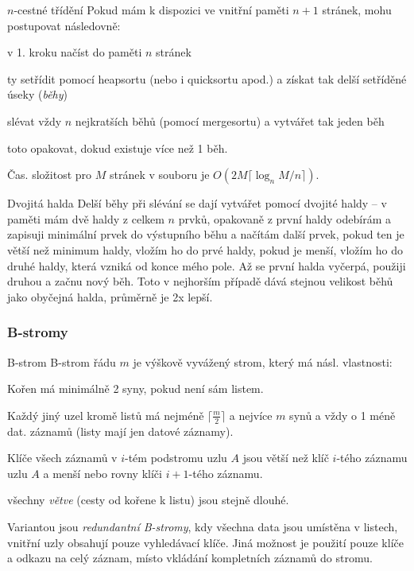 \begin{algoritmusN}{$n$-cestné třídění}
Pokud mám k dispozici ve vnitřní paměti $n+1$ stránek, mohu postupovat následovně:
\begin{pitemize}
    \item v 1. kroku načíst do paměti $n$ stránek
    \item ty setřídit pomocí heapsortu (nebo i quicksortu apod.) a získat tak delší setříděné úseky (\emph{běhy})
    \item slévat vždy $n$ nejkratších běhů (pomocí mergesortu) a vytvářet tak jeden běh
    \item toto opakovat, dokud existuje více než 1 běh.
\end{pitemize}
Čas. složitost pro $M$ stránek v souboru je $O(2M\lceil\log_n M/n\rceil)$.
\end{algoritmusN}

\begin{algoritmusN}{Dvojitá halda}
Delší běhy při slévání se dají vytvářet pomocí dvojité haldy -- v paměti mám dvě haldy z celkem $n$ prvků, opakovaně z první haldy odebírám a zapisuji minimální prvek do výstupního běhu a načítám další prvek, pokud ten je větší než minimum haldy, vložím ho do prvé haldy, pokud je menší, vložím ho do druhé haldy, která vzniká od konce mého pole. Až se první halda vyčerpá, použiji druhou a začnu nový běh. Toto v nejhorším případě dává stejnou velikost běhů jako obyčejná halda, průměrně je 2x lepší.
\end{algoritmusN}


\subsubsection*{B-stromy}

\begin{definiceN}{B-strom}
B-strom řádu $m$ je výškově vyvážený strom, který má násl. vlastnosti:
\begin{penumerate}
    \item Kořen má minimálně 2 syny, pokud není sám listem.
    \item Každý jiný uzel kromě listů má nejméně $\lceil\frac{m}{2}\rceil$ a nejvíce $m$ synů a vždy o 1 méně dat. záznamů (listy mají jen datové záznamy).
    \item Klíče všech záznamů v $i$-tém podstromu uzlu $A$ jsou větší než klíč $i$-tého záznamu uzlu $A$ a menší nebo rovny klíči $i+1$-tého záznamu.
    \item všechny \emph{větve} (cesty od kořene k listu) jsou stejně dlouhé.
\end{penumerate}
Variantou jsou \emph{redundantní B-stromy}, kdy všechna data jsou umístěna v listech, vnitřní uzly obsahují pouze vyhledávací klíče. Jiná možnost je použití pouze klíče a odkazu na celý záznam, místo vkládání kompletních záznamů do stromu.
\end{definiceN}

